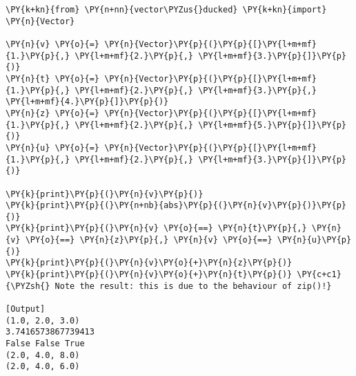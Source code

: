 \begin{Verbatim}[label=\makebox{\url{https://bitbucket.org/lbaldini/programming/src/tip/snippets/test\_vector\_ducked.py}},commandchars=\\\{\}]
\PY{k+kn}{from} \PY{n+nn}{vector\PYZus{}ducked} \PY{k+kn}{import} \PY{n}{Vector}
       
\PY{n}{v} \PY{o}{=} \PY{n}{Vector}\PY{p}{(}\PY{p}{[}\PY{l+m+mf}{1.}\PY{p}{,} \PY{l+m+mf}{2.}\PY{p}{,} \PY{l+m+mf}{3.}\PY{p}{]}\PY{p}{)}
\PY{n}{t} \PY{o}{=} \PY{n}{Vector}\PY{p}{(}\PY{p}{[}\PY{l+m+mf}{1.}\PY{p}{,} \PY{l+m+mf}{2.}\PY{p}{,} \PY{l+m+mf}{3.}\PY{p}{,} \PY{l+m+mf}{4.}\PY{p}{]}\PY{p}{)}
\PY{n}{z} \PY{o}{=} \PY{n}{Vector}\PY{p}{(}\PY{p}{[}\PY{l+m+mf}{1.}\PY{p}{,} \PY{l+m+mf}{2.}\PY{p}{,} \PY{l+m+mf}{5.}\PY{p}{]}\PY{p}{)}
\PY{n}{u} \PY{o}{=} \PY{n}{Vector}\PY{p}{(}\PY{p}{[}\PY{l+m+mf}{1.}\PY{p}{,} \PY{l+m+mf}{2.}\PY{p}{,} \PY{l+m+mf}{3.}\PY{p}{]}\PY{p}{)}

\PY{k}{print}\PY{p}{(}\PY{n}{v}\PY{p}{)}
\PY{k}{print}\PY{p}{(}\PY{n+nb}{abs}\PY{p}{(}\PY{n}{v}\PY{p}{)}\PY{p}{)}
\PY{k}{print}\PY{p}{(}\PY{n}{v} \PY{o}{==} \PY{n}{t}\PY{p}{,} \PY{n}{v} \PY{o}{==} \PY{n}{z}\PY{p}{,} \PY{n}{v} \PY{o}{==} \PY{n}{u}\PY{p}{)}
\PY{k}{print}\PY{p}{(}\PY{n}{v}\PY{o}{+}\PY{n}{z}\PY{p}{)}
\PY{k}{print}\PY{p}{(}\PY{n}{v}\PY{o}{+}\PY{n}{t}\PY{p}{)} \PY{c+c1}{\PYZsh{} Note the result: this is due to the behaviour of zip()!}

[Output]
(1.0, 2.0, 3.0)
3.7416573867739413
False False True
(2.0, 4.0, 8.0)
(2.0, 4.0, 6.0)
\end{Verbatim}